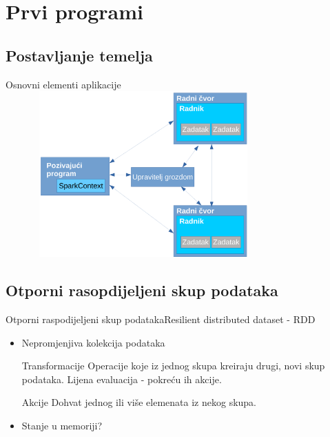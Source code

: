 \documentclass{beamer}
\begin{document}
\section{Prvi programi}

\subsection{Postavljanje temelja}

\begin{frame}{Osnovni elementi aplikacije}
	\includegraphics[width=300pt, height=180pt]{elementiAplikacijeCropped.pdf}%
\end{frame}

\subsection{Otporni rasopdijeljeni skup podataka}

\begin{frame}{Otporni raspodijeljeni skup podataka}{Resilient distributed dataset - RDD}
  \begin{itemize}
  \item {
 	Nepromjenjiva kolekcija podataka
 	\pause
  }
  
  \begin{block}{Transformacije}
	Operacije koje iz jednog skupa kreiraju drugi, novi skup podataka.
	\alert{Lijena evaluacija} - pokreću ih akcije.
	\end{block}  
	
  \pause
  \begin{block}{Akcije}
	Dohvat jednog ili više elemenata iz nekog skupa. 
  \end{block}
  \pause  
  
  \item {
 	Stanje u memoriji?
  }
  \end{itemize}
\end{frame}
\end{document}
